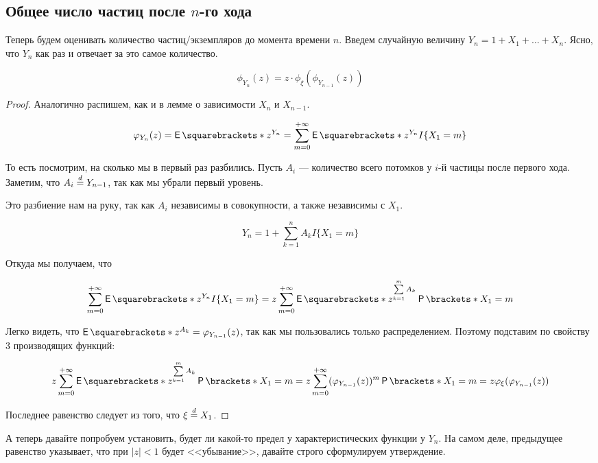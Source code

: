 \subsection{Общее число частиц после $n$-го хода}

Теперь будем оценивать количество частиц/экземпляров до момента времени $n$.
Введем случайную величину $Y_n = 1 + X_1 + \ldots + X_n$. Ясно, что $Y_n$
как раз и отвечает за это самое количество.

\begin{lemma}[О зависимости $Y_n$ и $Y_{n - 1}$]
  \[
    \phi_{Y_n}(z) = z\cdot\phi_{\xi}(\phi_{Y_{n - 1}}(z))
  \]
\end{lemma}

\begin{proof}
  Аналогично распишем, как и в лемме о зависимости $X_n$ и $X_{n - 1}$.

  \[
    \phi_{Y_n}(z) = \E{z^{Y_n}} = \sum\limits_{m = 0}^{+\infty} \E{z^{Y_n}
    I\{X_1 = m\}}
  \]

  То есть посмотрим, на сколько мы в первый раз разбились. Пусть $A_i$ --- 
  количество всего потомков у $i$-й частицы после первого
  хода. Заметим, что $A_i \overset{d}{=} Y_{n - 1}$, так как мы убрали первый уровень.

  Это разбиение нам на руку, так как $A_i$ независимы в совокупности, а также
  независимы с $X_1$.

  \[
    Y_n = 1 + \sum\limits_{k = 1}^n A_kI\{X_1 = m\}
  \]

  Откуда мы получаем, что

  \[
    \sum\limits_{m = 0}^{+\infty} \E{z^{Y_n}
    I\{X_1 = m\}} = z\sum\limits_{m = 0}^{+\infty} \E{z^{\sum\limits_{k = 1}^m
    A_k}} \Pr{X_1 = m}
  \]

  Легко видеть, что $\E{z^{A_k}} = \phi_{Y_{n - 1}}(z)$, так как мы пользовались
  только
  распределением. Поэтому подставим по свойству 3 производящих функций:

  \[
    z\sum\limits_{m = 0}^{+\infty} \E{z^{\sum\limits_{k = 1}^m
    A_k}} \Pr{X_1 = m} = z\sum\limits_{m = 0}^{+\infty} 
    (\phi_{Y_{n - 1}}(z))^m\Pr{X_1 = m} = z\phi_{\xi}(\phi_{Y_{n - 1}}(z))
  \]

  Последнее равенство следует из того, что $\xi \overset{d}{=} X_1$.
\end{proof}

А теперь давайте попробуем установить, будет ли какой-то предел у характеристических
функции у $Y_n$. На самом деле, предыдущее равенство указывает, что при $|z| < 1$
будет <<убывание>>, давайте строго сформулируем утверждение.

